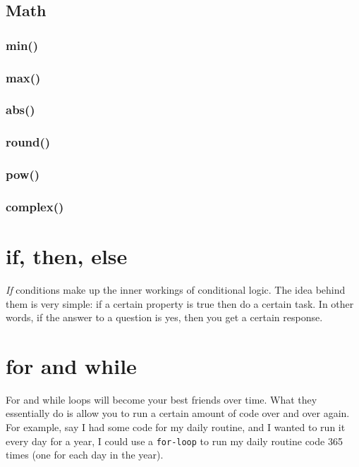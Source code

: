\documentclass[12pt,a4paper]{book}
\begin{document}
			\subsection{Math}
				\subsubsection{min()}

				\subsubsection{max()}

				\subsubsection{abs()}

				\subsubsection{round()}

				\subsubsection{pow()}

				\subsubsection{complex()}

		\section{if, then, else}
			\textit{If} conditions make up the inner workings of conditional logic. The idea behind them is very simple: if a certain property is true then do a certain task. In other words, if the answer to a question is yes, then you get a certain response.
			
		\section{for and while}
				For and while loops will become your best friends over time. What they essentially do is allow you to run a certain amount of code over and over again. For example, say I had some code for my daily routine, and I wanted to run it every day for a year, I could use a \texttt{for-loop} to run my daily routine code 365 times (one for each day in the year). 
				
\end{document}
